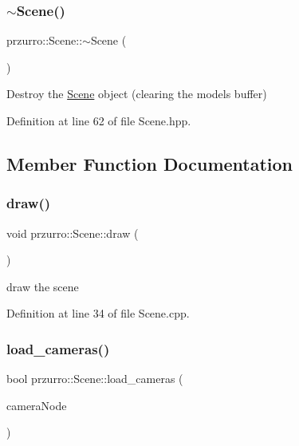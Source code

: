 \subsubsection{\texorpdfstring{$\sim$Scene()}{~Scene()}}
{\footnotesize\ttfamily przurro\+::\+Scene\+::$\sim$\+Scene (\begin{DoxyParamCaption}{ }\end{DoxyParamCaption})\hspace{0.3cm}{\ttfamily [inline]}}



Destroy the \mbox{\hyperlink{classprzurro_1_1_scene}{Scene}} object (clearing the models buffer) 



Definition at line 62 of file Scene.\+hpp.



\subsection{Member Function Documentation}
\mbox{\label{classprzurro_1_1_scene_a8f6186a7e9ee5e998c9d3051291026ed}} 
\subsubsection{\texorpdfstring{draw()}{draw()}}
{\footnotesize\ttfamily void przurro\+::\+Scene\+::draw (\begin{DoxyParamCaption}{ }\end{DoxyParamCaption})}



draw the scene 



Definition at line 34 of file Scene.\+cpp.

\mbox{\label{classprzurro_1_1_scene_aafbe64cd67261b27b15fa3219027455e}} 
\subsubsection{\texorpdfstring{load\_cameras()}{load\_cameras()}}
{\footnotesize\ttfamily bool przurro\+::\+Scene\+::load\+\_\+cameras (\begin{DoxyParamCaption}\item[{X\+M\+L\+\_\+\+Node $\ast$}]{camera\+Node }\end{DoxyParamCaption})}



